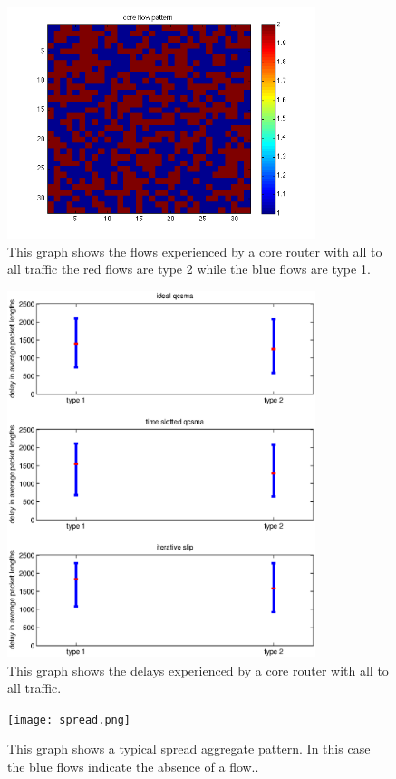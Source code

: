 \documentclass{IEEEtran}%
\begin{document}
\begin{figure}%
	 \includegraphics[width=90mm]{all2allflows.png}
	\caption{This graph shows the flows experienced by a core router with all to all traffic the red flows are type 2 while the blue flows are type 1.}
	\label{all_to_all_flows}
\end{figure}

\begin{figure}%
	 \includegraphics[width=90mm]{all_2_all.eps}
	\caption{This graph shows the delays experienced by a core router with all to all traffic.}
	\label{all_to_all}
\end{figure}


\begin{figure}%
	 \texttt{[image: spread.png]}
	\caption{This graph shows a typical spread aggregate pattern.  In this case the blue flows indicate the absence of a flow..}
	\label{spreadagg}
\end{figure}
\end{document}
